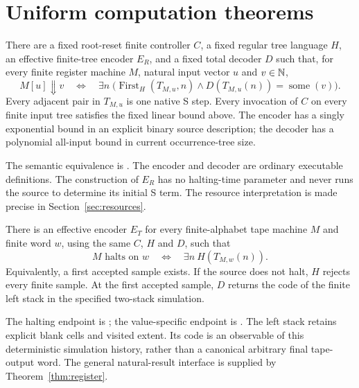\section{Uniform computation theorems}

\begin{theorem}\label{thm:register}
There are a fixed root-reset finite controller $C$, a fixed regular tree
language $H$, an effective finite-tree encoder $E_R$, and a fixed total decoder
$D$ such that, for every finite register machine $M$, natural input vector $u$
and $v\in\mathbb{N}$,
\[
 M[u]\Downarrow v\quad\Longleftrightarrow\quad
 \exists n\;\bigl(\operatorname{First}_H(T_{M,u},n)
           \land D(T_{M,u}(n))=\operatorname{some}(v)\bigr).
\]
Every adjacent pair in $T_{M,u}$ is one native S step. Every invocation of $C$
on every finite input tree satisfies the fixed linear bound above. The encoder
has a singly exponential bound in an explicit binary source description; the
decoder has a polynomial all-input bound in current occurrence-tree size.
\end{theorem}

The semantic equivalence is
. The encoder and decoder are
ordinary executable definitions. The construction of $E_R$ has no halting-time
parameter and never runs the source to determine its initial S term. The
resource interpretation is made precise in Section~\ref{sec:resources}.

\begin{theorem}\label{thm:tape}
There is an effective encoder $E_T$ for every finite-alphabet tape machine $M$
and finite word $w$, using the same $C$, $H$ and $D$, such that
\[
 M\text{ halts on }w\quad\Longleftrightarrow\quad
       \exists n\ H(T_{M,w}(n)).
\]
Equivalently, a first accepted sample exists. If the source does not halt,
$H$ rejects every finite sample. At the first accepted sample, $D$ returns the
code of the finite left stack in the specified two-stack simulation.
\end{theorem}

The halting endpoint is ; the
value-specific endpoint is
.
The left stack retains explicit blank cells and visited extent. Its code is
an observable of this deterministic simulation history, rather than a
canonical arbitrary final tape-output word. The general natural-result
interface is supplied by Theorem~\ref{thm:register}.

